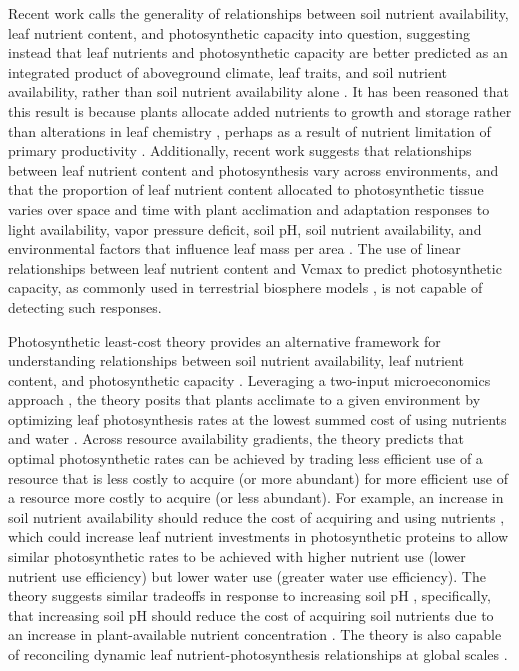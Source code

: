 Recent work calls the generality of relationships between soil nutrient availability, leaf nutrient content, and photosynthetic capacity into question, suggesting instead that leaf nutrients and photosynthetic capacity are better predicted as an integrated product of aboveground climate, leaf traits, and soil nutrient availability, rather than soil nutrient availability alone . It has been reasoned that this result is because plants allocate added nutrients to growth and storage rather than alterations in leaf chemistry , perhaps as a result of nutrient limitation of primary productivity . Additionally, recent work suggests that relationships between leaf nutrient content and photosynthesis vary across environments, and that the proportion of leaf nutrient content allocated to photosynthetic tissue varies over space and time with plant acclimation and adaptation responses to light availability, vapor pressure deficit, soil pH, soil nutrient availability, and environmental factors that influence leaf mass per area . The use of linear relationships between leaf nutrient content and Vcmax to predict photosynthetic capacity, as commonly used in terrestrial biosphere models , is not capable of detecting such responses.

Photosynthetic least-cost theory provides an alternative framework for understanding relationships between soil nutrient availability, leaf nutrient content, and photosynthetic capacity . Leveraging a two-input microeconomics approach , the theory posits that plants acclimate to a given environment by optimizing leaf photosynthesis rates at the lowest summed cost of using nutrients and water . Across resource availability gradients, the theory predicts that optimal photosynthetic rates can be achieved by trading less efficient use of a resource that is less costly to acquire (or more abundant) for more efficient use of a resource more costly to acquire (or less abundant). For example, an increase in soil nutrient availability should reduce the cost of acquiring and using nutrients , which could increase leaf nutrient investments in photosynthetic proteins to allow similar photosynthetic rates to be achieved with higher nutrient use (lower nutrient use efficiency) but lower water use (greater water use efficiency). The theory suggests similar tradeoffs in response to increasing soil pH , specifically, that increasing soil pH should reduce the cost of acquiring soil nutrients due to an increase in plant-available nutrient concentration . The theory is also capable of reconciling dynamic leaf nutrient-photosynthesis relationships at global scales .

